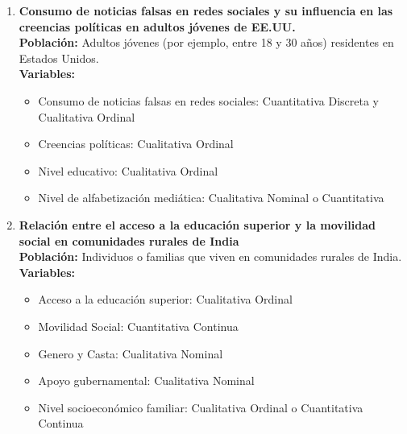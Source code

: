 \documentclass[12pt, letterpaper]{article}
\begin{document}
\begin{enumerate}
\item \textbf{Consumo de noticias falsas en redes sociales y su influencia en las creencias políticas en adultos jóvenes de EE.UU.} \\ 
\textbf{Población:} Adultos jóvenes (por ejemplo, entre 18 y 30 años) residentes en Estados Unidos. \\ 
\textbf{Variables:}
\begin{itemize}
  \item Consumo de noticias falsas en redes sociales: Cuantitativa Discreta y Cualitativa Ordinal
  \item Creencias políticas: Cualitativa Ordinal
  \item Nivel educativo: Cualitativa Ordinal
  \item Nivel de alfabetización mediática: Cualitativa Nominal o Cuantitativa
\end{itemize}


\item \textbf{Relación entre el acceso a la educación superior y la movilidad social en comunidades rurales de India} \\ 
\textbf{Población:} Individuos o familias que viven en comunidades rurales de India. \\ 
\textbf{Variables:}
\begin{itemize}
    \item Acceso a la educación superior: Cualitativa Ordinal
    \item Movilidad Social: Cuantitativa Continua
    \item Genero y Casta: Cualitativa Nominal
    \item Apoyo gubernamental: Cualitativa Nominal
    \item Nivel socioeconómico familiar: Cualitativa Ordinal o Cuantitativa Continua
\end{itemize}

\end{enumerate}
\end{document}
